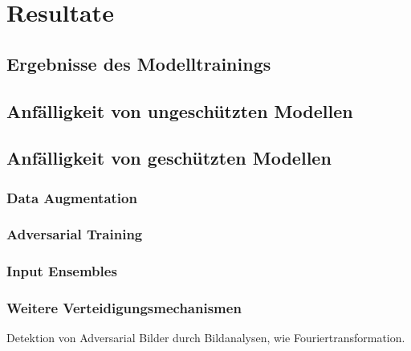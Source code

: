 \section{Resultate}


\subsection{Ergebnisse des Modelltrainings}

\subsection{Anfälligkeit von ungeschützten Modellen}

\subsection{Anfälligkeit von geschützten Modellen}

\subsubsection{Data Augmentation}

\subsubsection{Adversarial Training}

\subsubsection{Input Ensembles}

\subsubsection{Weitere Verteidigungsmechanismen}

Detektion von Adversarial Bilder durch Bildanalysen, wie Fouriertransformation. 
